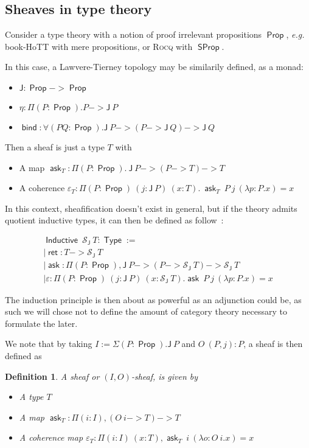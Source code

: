 \documentclass[11pt]{article}
\newtheorem{definition}[theorem]{Definition}
\DeclareMathOperator{\Prop}{\mathsf{Prop}}
\DeclareMathOperator{\SProp}{\mathsf{SProp}}
\DeclareMathOperator{\Type}{\mathsf{Type}}
\DeclareMathOperator{\ask}{\mathsf{ask}}
\DeclareMathOperator{\bind}{\mathsf{bind}}
\DeclareMathOperator{\Inductive}{\mathsf{Inductive}}
\DeclareMathOperator{\ret}{\mathsf{ret}}
\newcommand{\0}{\mathbf{0}}
\newcommand{\1}{\mathbf{1}}
\begin{document}
\subsection{Sheaves in type theory}\label{shfinTT}

Consider a type theory with a notion of proof irrelevant propositions $\Prop$, \emph{e.g.} book-HoTT with mere propositions, or \textsc{Rocq} with $\SProp$.

In this case, a Lawvere-Tierney topology may be similarily defined, as a monad:
\begin{itemize}
    \item $\mathsf{J} : \Prop -> \Prop$
    \item $\eta : \Pi (P:\Prop).P -> \mathsf{J}\ P$
    \item $\bind : \forall (P Q: \Prop). \mathsf{J}\ P -> (P -> \mathsf{J}\ Q) -> \mathsf{J}\ Q$
\end{itemize}

Then a sheaf is just a type $T$ with 
\begin{itemize}
    \item A map $\ask_T : \Pi (P:\Prop).\ \mathsf{J}\ P -> (P -> T) -> T$
    \item A coherence $\varepsilon_T : \Pi (P:\Prop)\ (j : \mathsf{J}\ P)\ (x:T).\ \ask_T\ P\ j\ (\lambda p:P.x) = x$
\end{itemize}

In this context, sheafification doesn't exist in general, but if the theory admits quotient inductive types, it can then be defined as follow~:

$$
\begin{array}{l}
    \Inductive\ \mathcal{S}_{\mathsf{J}}\ T : \Type := \\
    \mid \ret : T -> \mathcal{S}_{\mathsf{J}}\ T\\
    \mid \ask : \Pi (P:\Prop), \mathsf{J}\ P -> (P -> \mathcal{S}_{\mathsf{J}}\ T) -> \mathcal{S}_{\mathsf{J}}\ T\\
    \mid \varepsilon : \Pi (P:\Prop)\ (j : \mathsf J\ P)\ (x : \mathcal{S}_{\mathsf{J}}\ T). \ask\ P\ j\ (\lambda p:P. x) = x
\end{array}
$$

The induction principle is then about as powerful as an adjunction could be, as such we will chose not to define the amount of category theory necessary to formulate the later.

We note that by taking $I := \Sigma (P:\Prop). \mathsf{J}\ P$ and $O\ (P,j) : P$, a sheaf is then defined as
\begin{definition}\label{IOshf}
    A \emph{sheaf} or \emph{$(I,O)$-sheaf}, is given by
\begin{itemize}
    \item A type $T$
    \item A map $\ask_T : \Pi (i:I), (O\ i -> T) -> T$
    \item A coherence map $\varepsilon_T : \Pi(i:I)\ (x:T), \ask_T\ i\ (\lambda o:O\  i.x) = x$
\end{itemize}

\end{definition}
\end{document}
